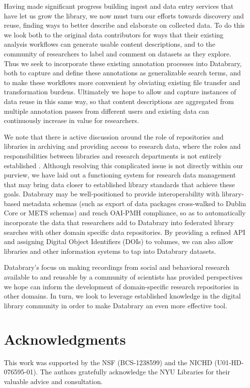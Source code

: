 \documentclass{sig-alternate}
\begin{document}
Having made significant progress building ingest and data entry services that have let us grow the library, we now must turn our efforts towards discovery and reuse, finding ways to better describe and elaborate on collected data.
To do this we look both to the original data contributors for ways that their existing analysis workflows can generate usable content descriptions, and to the community of researchers to label and comment on datasets as they explore.
Thus we seek to incorporate these existing annotation processes into Databrary, both to capture and define these annotations as generalizable search terms, and to make these workflows more convenient by obviating existing file transfer and transformation burdens.
Ultimately we hope to allow and capture instances of data reuse in this same way, so that content descriptions are aggregated from multiple annotation passes from different users and existing data can continuously increase in value for researchers.

We note that there is active discussion around the role of repositories and libraries in archiving and providing access to research data, where the roles and responsibilities between libraries and research departments is not entirely established \cite{Castelli_etal_2013, Nielson_Hjørland_2014, Macmillan_2014, Pinfield_etal_2014}.
Although resolving this complicated issue is not directly within our purview, we have laid out a functioning system for research data management that may bring data closer to established library standards that achieve these goals.
Databrary may be well-positioned to provide interoperability with library-based metadata schemas (such as export of data packages cross-walked to Dublin Core or METS schemas) and reach OAI-PMH compliance, so as to automatically incorporate the data that researchers add to Databrary into federated library searches with other domain specific data repositories.
By providing a refined API and assigning Digital Object Identifiers (DOIs) to volumes, we can also allow libraries and other information systems to tap into Databrary datasets.

Databrary's focus on making recordings from social and behavioral research available to and reusable by a community of scientists has provided perspectives we hope can inform the development of domain-specific research repositories in other domains. 
In turn, we look to leverage established knowledge in the digital library community in order to make Databrary an even more effective tool. 

\section*{Acknowledgments}

This work was supported by the NSF (BCS-1238599) and the NICHD (U01-HD-076595-01).
The authors gratefully acknowledge the NYU Libraries for their valuable advice and consultation.



\end{document}

